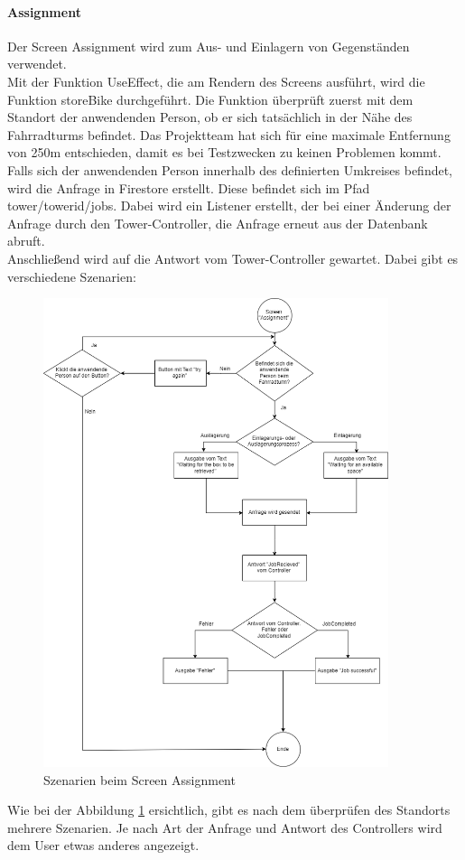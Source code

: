 \paragraph{Assignment}Der Screen Assignment wird zum Aus- und Einlagern von Gegenständen verwendet.\\
Mit der Funktion UseEffect, die am Rendern des Screens ausführt, wird die Funktion storeBike durchgeführt. Die Funktion überprüft zuerst mit dem Standort der anwendenden Person, ob er sich tatsächlich in der Nähe des Fahrradturms befindet. Das Projektteam hat sich für eine maximale Entfernung von 250m entschieden, damit es bei Testzwecken zu keinen Problemen kommt. \\
Falls sich der anwendenden Person innerhalb des definierten Umkreises befindet, wird die Anfrage in Firestore erstellt. Diese befindet sich im Pfad tower/towerid/jobs. Dabei wird ein Listener erstellt, der bei einer Änderung der Anfrage durch den Tower-Controller, die Anfrage erneut aus der Datenbank abruft.\\
Anschließend wird auf die Antwort vom Tower-Controller gewartet. Dabei gibt es verschiedene Szenarien:\\
\begin{figure}[H]
  \centering
  \includegraphics[width=0.9\textwidth]{images/assignmentdiagramm.png}
  \caption{Szenarien beim Screen Assignment}
  \label{fig:assignmentsze}
\end{figure}
Wie bei der Abbildung \ref*{fig:assignmentsze} ersichtlich, gibt es nach dem überprüfen des Standorts mehrere Szenarien. Je nach Art der Anfrage und Antwort des Controllers wird dem User etwas anderes angezeigt.\\

